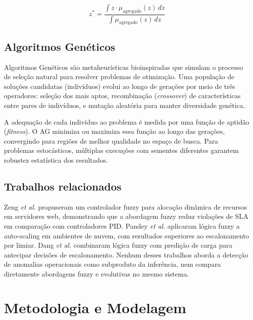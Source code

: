 \documentclass[12pt, a4paper]{article}
\begin{document}
\begin{equation}
  z^* = \frac{\displaystyle\int z \cdot \mu_{\text{agregado}}(z)\, dz}{\displaystyle\int \mu_{\text{agregado}}(z)\, dz}
\end{equation}

\subsection{Algoritmos Genéticos}

Algoritmos Genéticos \cite{holland1975} são metaheurísticas bioinspiradas que simulam o processo de seleção natural para resolver problemas de otimização. Uma população de soluções candidatas (indivíduos) evolui ao longo de gerações por meio de três operadores: seleção dos mais aptos, recombinação (\textit{crossover}) de características entre pares de indivíduos, e mutação aleatória para manter diversidade genética.

A adequação de cada indivíduo ao problema é medida por uma função de aptidão (\textit{fitness}). O AG minimiza ou maximiza essa função ao longo das gerações, convergindo para regiões de melhor qualidade no espaço de busca. Para problemas estocásticos, múltiplas execuções com sementes diferentes garantem robustez estatística dos resultados.

\subsection{Trabalhos relacionados}

Zeng \textit{et al.} \cite{zeng2004} propuseram um controlador fuzzy para alocação dinâmica de recursos em servidores web, demonstrando que a abordagem fuzzy reduz violações de SLA em comparação com controladores PID. Pandey \textit{et al.} \cite{pandey2021} aplicaram lógica fuzzy a auto-scaling em ambientes de nuvem, com resultados superiores ao escalonamento por limiar. Dang \textit{et al.} \cite{dang2019} combinaram lógica fuzzy com predição de carga para antecipar decisões de escalonamento. Nenhum desses trabalhos aborda a detecção de anomalias operacionais como subproduto da inferência, nem compara diretamente abordagens fuzzy e evolutivas no mesmo sistema.

\section{Metodologia e Modelagem}
\end{document}
